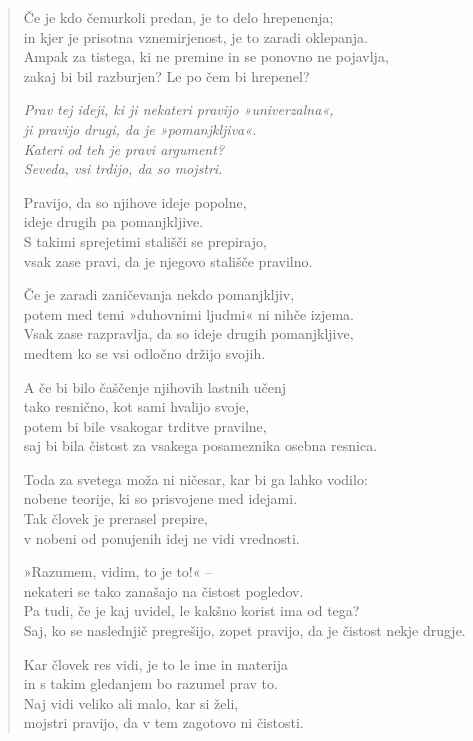 \begin{verse}
Če je kdo čemurkoli predan, je to delo hrepenenja;\\
in kjer je prisotna vznemirjenost, je to zaradi oklepanja.\\
Ampak za tistega, ki ne premine in se ponovno ne pojavlja,\\
zakaj bi bil razburjen? Le po čem bi hrepenel?

\emph{Prav tej ideji, ki ji nekateri pravijo »univerzalna«,}\\
\emph{ji pravijo drugi, da je »pomanjkljiva«.}\\
\emph{Kateri od teh je pravi argument?}\\
\emph{Seveda, vsi trdijo, da so mojstri.}

Pravijo, da so njihove ideje popolne,\\
ideje drugih pa pomanjkljive.\\
S takimi sprejetimi stališči se prepirajo,\\
vsak zase pravi, da je njegovo stališče pravilno.

Če je zaradi zaničevanja nekdo pomanjkljiv,\\
potem med temi »duhovnimi ljudmi« ni nihče izjema.\\
Vsak zase razpravlja, da so ideje drugih pomanjkljive,\\
medtem ko se vsi odločno držijo svojih.

A če bi bilo čaščenje njihovih lastnih učenj\\
tako resnično, kot sami hvalijo svoje,\\
potem bi bile vsakogar trditve pravilne,\\
saj bi bila čistost za vsakega posameznika osebna resnica.

Toda za svetega moža ni ničesar, kar bi ga lahko vodilo:\\
nobene teorije, ki so prisvojene med idejami.\\
Tak človek je prerasel prepire,\\
v nobeni od ponujenih idej ne vidi vrednosti.

»Razumem, vidim, to je to!« --\\
nekateri se tako zanašajo na čistost pogledov.\\
Pa tudi, če je kaj uvidel, le kakšno korist ima od tega?\\
Saj, ko se naslednjič pregrešijo, zopet pravijo, da je čistost nekje drugje.

Kar človek res vidi, je to le ime in materija\\
in s takim gledanjem bo razumel prav to.\\
Naj vidi veliko ali malo, kar si želi,\\
mojstri pravijo, da v tem zagotovo ni čistosti.


\end{verse}
